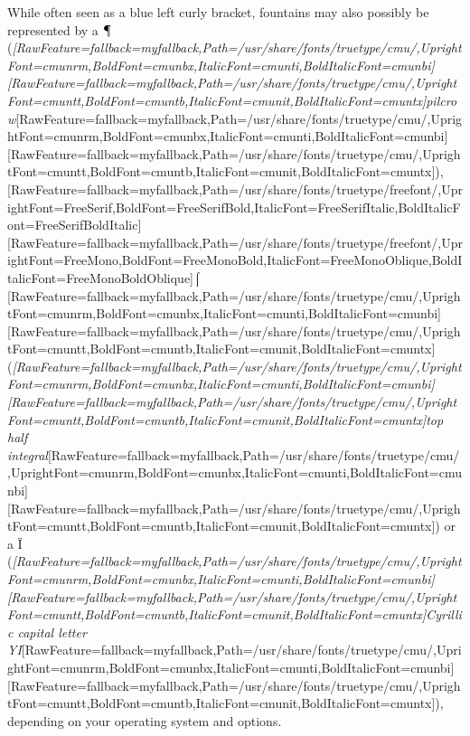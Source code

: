 While often seen as a blue left curly bracket, fountains may also possibly be represented by a {\mbox{$\text{\textparagraph}$}} ({\itshape \allowbreak{}\setmainfont{cmunti.ttf}[RawFeature={fallback=myfallback},Path=/usr/share/fonts/truetype/cmu/,UprightFont=cmunrm,BoldFont=cmunbx,ItalicFont=cmunti,BoldItalicFont=cmunbi]\setmonofont{cmunti.ttf}[RawFeature={fallback=myfallback},Path=/usr/share/fonts/truetype/cmu/,UprightFont=cmuntt,BoldFont=cmuntb,ItalicFont=cmunit,BoldItalicFont=cmuntx]\itshape pilcrow}\allowbreak{}\setmainfont{cmunrm.ttf}[RawFeature={fallback=myfallback},Path=/usr/share/fonts/truetype/cmu/,UprightFont=cmunrm,BoldFont=cmunbx,ItalicFont=cmunti,BoldItalicFont=cmunbi]\setmonofont{cmunrm.ttf}[RawFeature={fallback=myfallback},Path=/usr/share/fonts/truetype/cmu/,UprightFont=cmuntt,BoldFont=cmuntb,ItalicFont=cmunit,BoldItalicFont=cmuntx]), \allowbreak{}\setmainfont{FreeSerif.ttf}[RawFeature={fallback=myfallback},Path=/usr/share/fonts/truetype/freefont/,UprightFont=FreeSerif,BoldFont=FreeSerifBold,ItalicFont=FreeSerifItalic,BoldItalicFont=FreeSerifBoldItalic]\setmonofont{FreeSerif.ttf}[RawFeature={fallback=myfallback},Path=/usr/share/fonts/truetype/freefont/,UprightFont=FreeMono,BoldFont=FreeMonoBold,ItalicFont=FreeMonoOblique,BoldItalicFont=FreeMonoBoldOblique]⌠{$\text{ }$}\allowbreak{}\setmainfont{cmunrm.ttf}[RawFeature={fallback=myfallback},Path=/usr/share/fonts/truetype/cmu/,UprightFont=cmunrm,BoldFont=cmunbx,ItalicFont=cmunti,BoldItalicFont=cmunbi]\setmonofont{cmunrm.ttf}[RawFeature={fallback=myfallback},Path=/usr/share/fonts/truetype/cmu/,UprightFont=cmuntt,BoldFont=cmuntb,ItalicFont=cmunit,BoldItalicFont=cmuntx] ({\itshape \allowbreak{}\setmainfont{cmunti.ttf}[RawFeature={fallback=myfallback},Path=/usr/share/fonts/truetype/cmu/,UprightFont=cmunrm,BoldFont=cmunbx,ItalicFont=cmunti,BoldItalicFont=cmunbi]\setmonofont{cmunti.ttf}[RawFeature={fallback=myfallback},Path=/usr/share/fonts/truetype/cmu/,UprightFont=cmuntt,BoldFont=cmuntb,ItalicFont=cmunit,BoldItalicFont=cmuntx]\itshape top half integral}\allowbreak{}\setmainfont{cmunrm.ttf}[RawFeature={fallback=myfallback},Path=/usr/share/fonts/truetype/cmu/,UprightFont=cmunrm,BoldFont=cmunbx,ItalicFont=cmunti,BoldItalicFont=cmunbi]\setmonofont{cmunrm.ttf}[RawFeature={fallback=myfallback},Path=/usr/share/fonts/truetype/cmu/,UprightFont=cmuntt,BoldFont=cmuntb,ItalicFont=cmunit,BoldItalicFont=cmuntx]) or a Ї ({\itshape \allowbreak{}\setmainfont{cmunti.ttf}[RawFeature={fallback=myfallback},Path=/usr/share/fonts/truetype/cmu/,UprightFont=cmunrm,BoldFont=cmunbx,ItalicFont=cmunti,BoldItalicFont=cmunbi]\setmonofont{cmunti.ttf}[RawFeature={fallback=myfallback},Path=/usr/share/fonts/truetype/cmu/,UprightFont=cmuntt,BoldFont=cmuntb,ItalicFont=cmunit,BoldItalicFont=cmuntx]\itshape Cyrillic capital letter YI}\allowbreak{}\setmainfont{cmunrm.ttf}[RawFeature={fallback=myfallback},Path=/usr/share/fonts/truetype/cmu/,UprightFont=cmunrm,BoldFont=cmunbx,ItalicFont=cmunti,BoldItalicFont=cmunbi]\setmonofont{cmunrm.ttf}[RawFeature={fallback=myfallback},Path=/usr/share/fonts/truetype/cmu/,UprightFont=cmuntt,BoldFont=cmuntb,ItalicFont=cmunit,BoldItalicFont=cmuntx]), depending on your operating system\footnotemark[35] and options\footnotemark[36].


